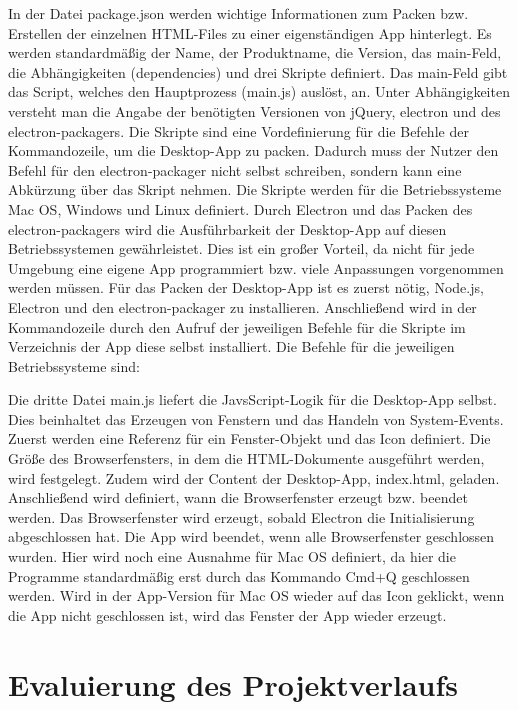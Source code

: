 In der Datei package.json werden wichtige Informationen zum Packen bzw. Erstellen der einzelnen HTML-Files zu einer eigenständigen App hinterlegt. Es werden standardmäßig der Name, der Produktname, die Version, das main-Feld, die Abhängigkeiten (dependencies) und drei Skripte definiert. Das main-Feld gibt das Script, welches den Hauptprozess (main.js) auslöst, an. Unter Abhängigkeiten versteht man die Angabe der benötigten Versionen von jQuery, electron und des electron-packagers. Die Skripte sind eine Vordefinierung für die Befehle der Kommandozeile, um die Desktop-App zu packen. Dadurch muss der Nutzer den Befehl für den electron-packager nicht selbst schreiben, sondern kann eine Abkürzung über das Skript nehmen. Die Skripte werden für die Betriebssysteme Mac OS, Windows und Linux definiert. Durch Electron und das Packen des electron-packagers wird die Ausführbarkeit der Desktop-App auf diesen Betriebssystemen gewährleistet. Dies ist ein großer Vorteil, da nicht für jede Umgebung eine eigene App programmiert bzw. viele Anpassungen vorgenommen werden müssen. Für das Packen der Desktop-App ist es zuerst nötig, Node.js, Electron und den electron-packager zu installieren. Anschließend wird in der Kommandozeile durch den Aufruf der jeweiligen Befehle für die Skripte im Verzeichnis der App diese selbst installiert. Die Befehle für die jeweiligen Betriebssysteme sind:
\lstset{language=html}

Die dritte Datei main.js liefert die JavsScript-Logik für die Desktop-App selbst. Dies beinhaltet das Erzeugen von Fenstern und das Handeln von System-Events. Zuerst werden eine Referenz für ein Fenster-Objekt und das Icon definiert. Die Größe des Browserfensters, in dem die HTML-Dokumente ausgeführt werden, wird festgelegt. Zudem wird der Content der Desktop-App, index.html, geladen. Anschließend wird definiert, wann die Browserfenster erzeugt bzw. beendet werden. Das Browserfenster wird erzeugt, sobald Electron die Initialisierung abgeschlossen hat. Die App wird beendet, wenn alle Browserfenster geschlossen wurden. Hier wird noch eine Ausnahme für Mac OS definiert, da hier die Programme standardmäßig erst durch das Kommando Cmd+Q geschlossen werden. Wird in der App-Version für Mac OS wieder auf das Icon geklickt, wenn die App nicht geschlossen ist, wird das Fenster der App wieder erzeugt.

\section{Evaluierung des Projektverlaufs}
